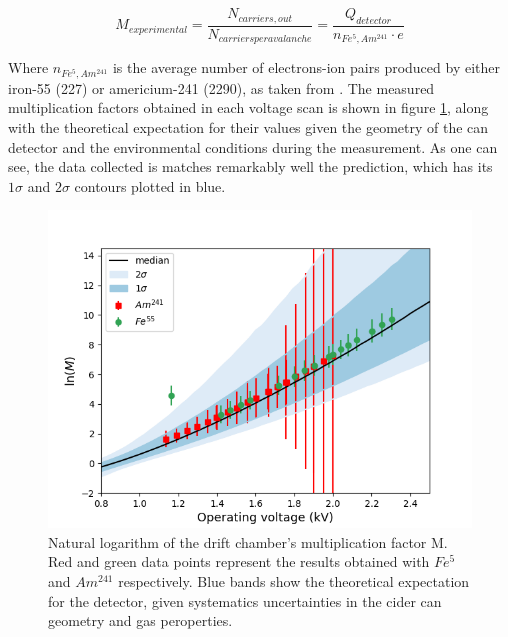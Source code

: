 \begin{equation}
  M_{experimental} = \frac{N_{carriers,out}}{N_{carriers per avalanche}} = \frac{Q_{detector}}{n_{Fe^{5},Am^{241}}\cdot e}
\end{equation}

Where $n_{Fe^{5},Am^{241}}$ is the average number of electrons-ion pairs produced by either iron-55 (227) or americium-241 (2290), as taken from \cite{can_paper}. The measured multiplication factors obtained in each voltage scan is shown in figure \ref{final_lnm}, along with the theoretical expectation for their values given the geometry of the can detector and the environmental conditions during the measurement. As one can see, the data collected is matches remarkably well the prediction, which has its $1\sigma$ and $2\sigma$ contours plotted in blue.

\begin{figure}[H]
  \includegraphics[width=\textwidth]{graphics/lnM_final_plot.png}
  \caption{Natural logarithm of the drift chamber's multiplication factor M. Red and green data points represent the results obtained with $Fe^{5}$ and $Am^{241}$ respectively. Blue bands show the theoretical expectation for the detector, given systematics uncertainties in the cider can geometry and gas peroperties.}
  \label{final_lnm}
\end{figure}

